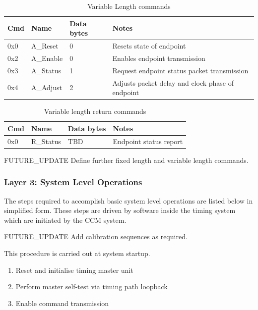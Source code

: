 \documentclass{dune}
\begin{document}
\begin{table}[h!]
  \centering
  \begin{tabular}{@{}lllp{9cm}@{}} \toprule
    Cmd & Name & Data bytes & Notes\\ \midrule
    0x0 & A\_Reset & 0 & Resets state of endpoint \\
    0x2 & A\_Enable & 0 & Enables endpoint transmission \\
    0x3 & A\_Status & 1 & Request endpoint status packet transmission \\ 
    0x4 & A\_Adjust & 2 & Adjusts packet delay and clock phase of endpoint \\ \bottomrule
  \end{tabular}
  \caption{Variable Length commands}
  \label{tab:async_cmds}
\end{table}

\begin{table}[h!]
  \centering
  \begin{tabular}{@{}lllp{9cm}@{}} \toprule
    Cmd & Name & Data bytes & Notes\\ \midrule
    0x0 & R\_Status & TBD & Endpoint status report \\ \bottomrule
  \end{tabular}
  \caption{Variable length return commands}
  \label{tab:async_ret_cmds}
\end{table}

{\color{red}FUTURE\_UPDATE} Define further fixed length and variable length commands.



\subsubsection{Layer 3: System Level Operations}

The steps required to accomplish basic system level operations are listed below in simplified form. These steps are driven by software inside the timing system which are initiated by the CCM system.

{\color{red}FUTURE\_UPDATE} Add calibration sequences as required.


This procedure is carried out at system startup.

\begin{enumerate}
	\item Reset and initialise timing master unit
	\item Perform master self-test via timing path loopback
	\item Enable command transmission
\end{enumerate}
\end{document}
